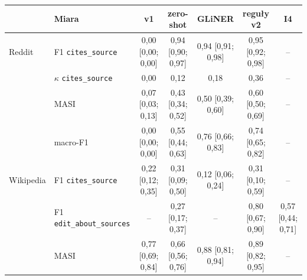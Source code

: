 \begin{tabular}{llccccc}
\toprule
 & Miara & v1 & zero-shot & GLiNER & reguły v2 & I4 \\
\midrule
Reddit & F1 \texttt{cites\_source} & 0{,}00 {\scriptsize [0{,}00; 0{,}00]} & 0{,}94 {\scriptsize [0{,}90; 0{,}97]} & 0{,}94 {\scriptsize [0{,}91; 0{,}98]} & 0{,}95 {\scriptsize [0{,}92; 0{,}98]} & -- \\
 & $\kappa$ \texttt{cites\_source} & 0{,}00 & 0{,}12 & 0{,}18 & 0{,}36 & -- \\
 & MASI & 0{,}07 {\scriptsize [0{,}03; 0{,}13]} & 0{,}43 {\scriptsize [0{,}34; 0{,}52]} & 0{,}50 {\scriptsize [0{,}39; 0{,}60]} & 0{,}60 {\scriptsize [0{,}50; 0{,}69]} & -- \\
 & macro-F1 & 0{,}00 {\scriptsize [0{,}00; 0{,}00]} & 0{,}55 {\scriptsize [0{,}44; 0{,}63]} & 0{,}76 {\scriptsize [0{,}66; 0{,}83]} & 0{,}74 {\scriptsize [0{,}65; 0{,}82]} & -- \\
\midrule
Wikipedia & F1 \texttt{cites\_source} & 0{,}22 {\scriptsize [0{,}12; 0{,}35]} & 0{,}31 {\scriptsize [0{,}09; 0{,}50]} & 0{,}12 {\scriptsize [0{,}06; 0{,}24]} & 0{,}31 {\scriptsize [0{,}10; 0{,}59]} & -- \\
 & F1 \texttt{edit\_about\_sources} & -- & 0{,}27 {\scriptsize [0{,}17; 0{,}37]} & -- & 0{,}80 {\scriptsize [0{,}67; 0{,}90]} & 0{,}57 {\scriptsize [0{,}44; 0{,}71]} \\
 & MASI & 0{,}77 {\scriptsize [0{,}69; 0{,}84]} & 0{,}66 {\scriptsize [0{,}56; 0{,}76]} & 0{,}88 {\scriptsize [0{,}81; 0{,}94]} & 0{,}89 {\scriptsize [0{,}82; 0{,}95]} & -- \\
\bottomrule
\end{tabular}

